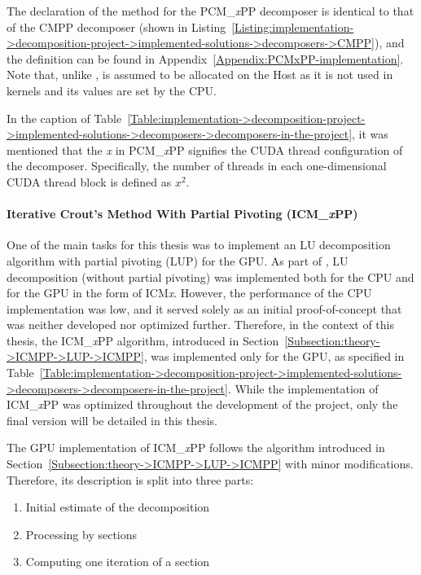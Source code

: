 The declaration of the  method for the PCM\_\textit{x}PP decomposer is identical to that of the CMPP decomposer (shown in Listing~\ref{Listing:implementation->decomposition-project->implemented-solutions->decomposers->CMPP}), and the definition can be found in Appendix~\ref{Appendix:PCMxPP-implementation}. Note that, unlike ,  is assumed to be allocated on the Host as it is not used in kernels and its values are set by the CPU.

In the caption of Table~\ref{Table:implementation->decomposition-project->implemented-solutions->decomposers->decomposers-in-the-project}, it was mentioned that the \textit{x} in PCM\_\textit{x}PP signifies the CUDA thread configuration of the decomposer. Specifically, the number of threads in each one-dimensional CUDA thread block is defined as $x^2$.

\paragraph{Iterative Crout's Method With Partial Pivoting (ICM\_\textit{x}PP)} One of the main tasks for this thesis was to implement an LU decomposition algorithm with partial pivoting (LUP) for the GPU. As part of  \cite{Cejka2022}, LU decomposition (without partial pivoting) was implemented both for the CPU and for the GPU in the form of ICM\textit{x}. However, the performance of the CPU implementation was low, and it served solely as an initial proof-of-concept that was neither developed nor optimized further. Therefore, in the context of this thesis, the ICM\_\textit{x}PP algorithm, introduced in Section~\ref{Subsection:theory->ICMPP->LUP->ICMPP}, was implemented only for the GPU, as specified in Table~\ref{Table:implementation->decomposition-project->implemented-solutions->decomposers->decomposers-in-the-project}. While the implementation of ICM\_\textit{x}PP was optimized throughout the development of the project, only the final version will be detailed in this thesis.

The GPU implementation of ICM\_\textit{x}PP follows the algorithm introduced in Section~\ref{Subsection:theory->ICMPP->LUP->ICMPP} with minor modifications. Therefore, its description is split into three parts:

\begin{enumerate}
	\item Initial estimate of the decomposition
	\item Processing by sections
	\item Computing one iteration of a section
\end{enumerate}

